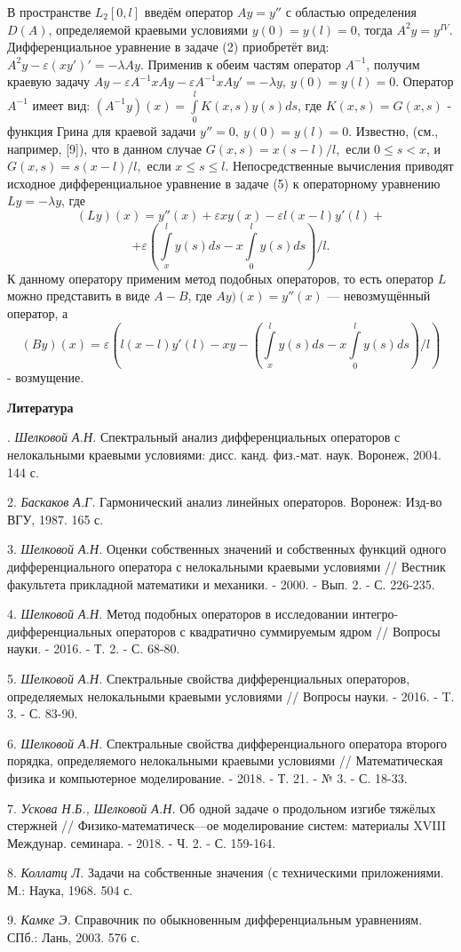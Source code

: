 В пространстве $L_{2}[0,l]$ введём оператор $Ay=y''$ с областью определения $D(A)$, определяемой краевыми условиями $y(0)=y(l)=0$, тогда $A^{2}y=y^{IV}$. Дифференциальное уравнение в задаче (2) приобретёт вид: $A^{2}y-\varepsilon(xy')'=-{\lambda}Ay$. Применив к обеим частям оператор $A^{-1}$, получим краевую задачу $Ay-{\varepsilon}A^{-1}xAy-{\varepsilon}A^{-1}xAy'=-{\lambda}y, ~ y(0)=y(l)=0$.
Оператор $A^{-1}$ имеет вид: $(A^{-1}y)(x)=\int\limits_0^l{K(x,s)y(s)}ds$, где $K(x,s)=G(x,s)$ - функция Грина для краевой задачи $y''=0,~y(0)=y(l)=0$.
Известно, (см., например, [9]), что в данном случае $G(x,s)=x(s-l)/l$,~если $0\le{s}<x$, и $G(x,s)=s(x-l)/l$,~если $x\le{s}\le{l}$.
Непосредственные вычисления приводят исходное дифференциальное уравнение в задаче (5) к операторному уравнению $Ly=-{\lambda}y$, где
$$(Ly)(x)=y''(x)+{\varepsilon}xy(x)-{\varepsilon}l(x-l)y'(l)+$$
$$+\varepsilon\left(\int\limits_x^l{y(s)}ds-x\int\limits_0^l{y(s)}ds\right)/l.$$
К данному оператору применим метод подобных операторов, то есть оператор $L$ можно представить в виде $A-B$, где $Ay)(x)=y''(x)$ --- невозмущённый оператор, а
$$(By)(x)={\varepsilon}\left(l(x-l)y'(l)-xy-\left(\int\limits_x^l{y(s)}ds-x\int\limits_0^l{y(s)}ds\right)/l\right)$$
- возмущение.



\smallskip \centerline {\bf Литература} . {\it Шелковой А.Н.} Спектральный анализ дифференциальных операторов с нелокальными краевыми условиями: дисс. канд. физ.-мат. наук. Воронеж, 2004. 144 с.

2. {\it Баскаков А.Г.} Гармонический анализ линейных операторов. Воронеж: Изд-во ВГУ, 1987. 165 с.

3. {\it Шелковой А.Н.} Оценки собственных значений и собственных функций одного дифференциального оператора с нелокальными краевыми условиями // Вестник факультета прикладной математики и механики. - 2000. - Вып. 2. - С. 226-235.

4. {\it Шелковой А.Н.} Метод подобных операторов в исследовании интегро-дифференциальных операторов с квадратично суммируемым ядром // Вопросы науки. - 2016. - Т. 2. - С. 68-80.

5. {\it Шелковой А.Н.} Спектральные свойства дифференциальных операторов, определяемых нелокальными краевыми условиями // Вопросы науки. - 2016. - T. 3. - С. 83-90.

6. {\it Шелковой А.Н.} Спектральные свойства дифференциального оператора второго порядка, определяемого нелокальными краевыми условиями // Математическая физика и компьютерное моделирование. - 2018. - Т. 21. - № 3. - С. 18-33.

7. {\it Ускова Н.Б., Шелковой А.Н.} Об одной задаче о продольном изгибе тяжёлых стержней // Физико-математическ---ое моделирование систем: материалы XVIII Междунар. семинара. - 2018. - Ч. 2. - С. 159-164.

8. {\it Коллатц Л.} Задачи на собственные значения (с техническими приложениями. М.: Наука, 1968. 504 с.

9. {\it Камке Э.} Справочник по обыкновенным дифференциальным уравнениям. СПб.: Лань, 2003. 576 с.
